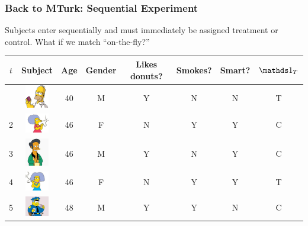 \documentclass[slides]{beamer} %
\begin{document}
\begin{frame}\frametitle{Back to MTurk: Sequential Experiment}

Subjects enter sequentially and must immediately be assigned treatment or control. \pause What if we match ``on-the-fly?'' \pause

\vspace{-0.25cm}
\begin{table}[htp]
\begin{center}
\small
\begin{tabular}{cccccccc}
$t$ &Subject & Age & Gender & Likes donuts? & Smokes? & Smart? & $\indic{T}$ \\ \hline \vspace{0.25cm} \pause
1 & \includegraphics[width=0.4in]{images/homer.jpg} & 40 & M & Y & N & N & \pause T \pause\\
2 & \includegraphics[width=0.4in]{images/selma.jpg} & 46 & F & N & Y & Y & \pause C \pause\\
3 & \includegraphics[width=0.4in]{images/apu.jpg} & 46 & M & Y & N & Y & \pause C \pause\\
4 & \includegraphics[width=0.4in]{images/patty.jpg} & 46 & F & N & Y & Y & \pause T \pause\\
5 & \includegraphics[width=0.4in]{images/wiggum.jpg} & 48 & M & Y & Y & N &  \pause C \\
\end{tabular}
\end{center}
\end{table}

\end{frame}
\end{document}
